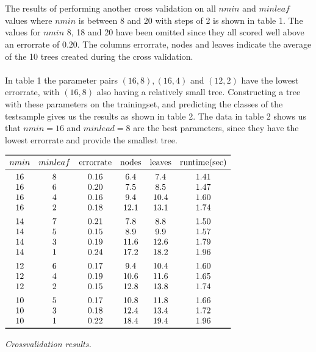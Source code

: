 \documentclass[a4paper,12pt]{scrartcl}
\begin{document}
    \\\\
    The results of performing another cross validation on all $nmin$ and $minleaf$ values where $nmin$ is between 8 and 20 with steps of 2 is shown in table 1. The values for $nmin$ 8, 18 and 20 have been omitted since they all scored well above an errorrate of $0.20$. The columns errorrate, nodes and leaves indicate the average of the 10 trees created during the cross validation.
    \\\\
    In table 1 the parameter pairs $(16,8),(16,4)$ and $(12,2)$ have the lowest errorrate, with $(16,8)$ also having a relatively small tree. Constructing a tree with these parameters on the trainingset, and predicting the classes of the testsample gives us the results as shown in table 2. The data in table 2 shows us that $nmin = 16$ and $minlead = 8$ are the best parameters, since they have the lowest errorrate and provide the smallest tree.

    \begin{table}[!htb]
    \small  

        \centering
        $\begin{array}{ *{6}{c} }
            \toprule
            nmin & minleaf & \text{errorrate} & \text{nodes} & \text{leaves} & \text{runtime(sec)} \\
            \midrule
                16 &  8  & 0.16  & 6.4 &  7.4 &  1.41 \\
                16 &  6  & 0.20  & 7.5 &  8.5 &  1.47 \\
                16 &  4  & 0.16  & 9.4 & 10.4 &  1.60 \\
                16 &  2  & 0.18  & 12.1 & 13.1 &  1.74 \\[1ex]
                14 &  7  & 0.21  & 7.8 &  8.8 &  1.50 \\
                14 &  5  & 0.15  & 8.9 &  9.9 &  1.57 \\
                14 &  3  & 0.19  & 11.6 & 12.6 &  1.79 \\
                14 &  1  & 0.24  & 17.2 & 18.2 &  1.96 \\[1ex]
                12 &  6  & 0.17  & 9.4 & 10.4 &  1.60 \\
                12 &  4  & 0.19 & 10.6 & 11.6 &  1.65 \\
                12 &  2  & 0.15 & 12.8 & 13.8 &  1.74 \\[1ex]
                10 &  5  & 0.17 & 10.8 & 11.8 &  1.66 \\
                10 &  3  & 0.18 & 12.4 & 13.4 &  1.72 \\
                10 &  1  & 0.22 & 18.4 & 19.4 &  1.96 \\
            \bottomrule
        \end{array}$
        \caption{\textit{Crossvalidation results.}}
    \end{table}
\end{document}
